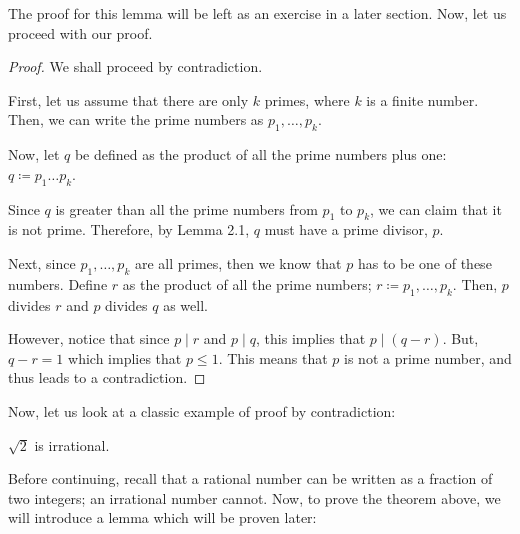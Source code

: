 \documentclass[openany]{book}
\newcommand*{\defeq}{\coloneqq}
\begin{document}
The proof for this lemma will be left as an exercise in a later section. Now, let us proceed with our proof.
\begin{proof}
	We shall proceed by contradiction.
	
	First, let us assume that there are only $k$ primes, where $k$ is a finite number. Then, we can write the prime numbers as $p_1, \ldots, p_k$.
	
	Now, let $q$ be defined as the product of all the prime numbers plus one: $q \defeq p_1\ldots p_k$. 
	
	Since $q$ is greater than all the prime numbers from $p_1$ to $p_k$, we can claim that it is not prime. Therefore, by Lemma 2.1, $q$ must have a prime divisor, $p$.
	
	Next, since $p_1,\ldots,p_k$ are all primes, then we know that $p$ has to be one of these numbers. Define $r$ as the product of all the prime numbers; $r\defeq p_1,\ldots,p_k$. Then, $p$ divides $r$ and $p$ divides $q$ as well.
	
	However, notice that since $p\mid r$ and $p \mid q$, this implies that $p\mid(q-r)$. But, $q-r=1$ which implies that $p\leq 1$. This means that $p$ is not a prime number, and thus leads to a contradiction.
\end{proof}

Now, let us look at a classic example of proof by contradiction:
\begin{thm}
	$\sqrt{2}$ is irrational.
\end{thm}

Before continuing, recall that a rational number can be written as a fraction of two integers; an irrational number cannot. Now, to prove the theorem above, we will introduce a lemma which will be proven later:
\end{document}
